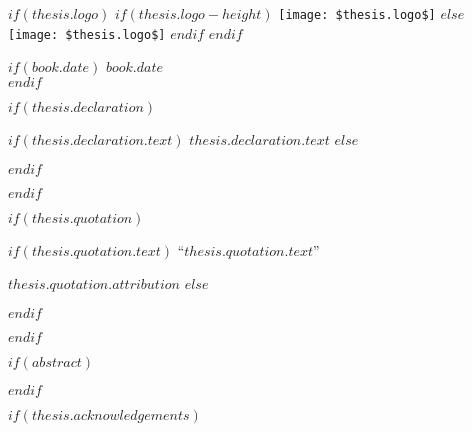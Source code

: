 \begin{titlepage}
\begin{center}
\vfill

$if(thesis.logo)$
$if(thesis.logo-height)$
\texttt{[image: \$thesis.logo\$]} %
$else$
\texttt{[image: \$thesis.logo\$]}
$endif$
$endif$

$if(book.date)$
{\large $book.date$}\\[4cm] %
$endif$

 
\vfill
\end{center}
\end{titlepage}

$if(thesis.declaration)$
\begin{declaration}
\addchaptertocentry{\authorshipname} %
$if(thesis.declaration.text)$
$thesis.declaration.text$
$else$

$endif$

\end{declaration}

\cleardoublepage
$endif$

$if(thesis.quotation)$

\vspace*{0.2\textheight}

$if(thesis.quotation.text)$
\noindent``{\itshape $thesis.quotation.text$}''\bigbreak

\hfill $thesis.quotation.attribution$
$else$

$endif$

$endif$

$if(abstract)$

\begin{abstract}
\addchaptertocentry{\abstractname} %
$abstract$
\end{abstract}

$endif$

$if(thesis.acknowledgements)$

